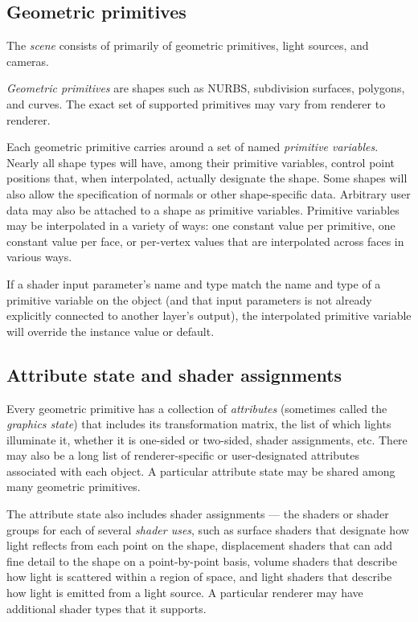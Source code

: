 \documentclass[11pt,letterpaper]{book}
\begin{document}
\subsection*{Geometric primitives}

The \emph{scene} consists of primarily of geometric primitives,
light sources, and cameras.

\emph{Geometric primitives} are shapes such as NURBS, subdivision surfaces,
polygons, and curves.  The exact set of supported primitives may vary
from renderer to renderer.

Each geometric primitive carries around a set of named \emph{primitive
  variables}.  Nearly all shape types will have, among their primitive
variables, control point positions that, when interpolated, actually
designate the shape.  Some shapes will also allow the specification of
normals or other shape-specific data.  Arbitrary user data may also be
attached to a shape as primitive variables.  Primitive variables may be
interpolated in a variety of ways: one constant value per primitive, one
constant value per face, or per-vertex values that are interpolated
across faces in various ways.

If a shader input parameter's name and type match the name and type
of a primitive variable on the object (and that input parameters is
not already explicitly connected to another layer's output), the
interpolated primitive variable will override the instance value or
default.


\subsection*{Attribute state and shader assignments}

Every geometric primitive has a collection of \emph{attributes} (sometimes
called the \emph{graphics state}) that includes its transformation
matrix, the list of which lights illuminate it, whether it is one-sided
or two-sided, shader assignments, etc.  There may also be a long list of
renderer-specific or user-designated attributes associated with each
object.  A particular attribute state may be shared among many geometric
primitives.

The attribute state also includes shader assignments --- the shaders or
shader groups for each of several \emph{shader uses}, such as surface
shaders that designate how light reflects from each point on the shape,
displacement shaders that can add fine detail to the shape on a
point-by-point basis, volume shaders that describe how light is
scattered within a region of space, and light shaders that describe how
light is emitted from a light source.  A particular renderer may have
additional shader types that it supports.
\end{document}
